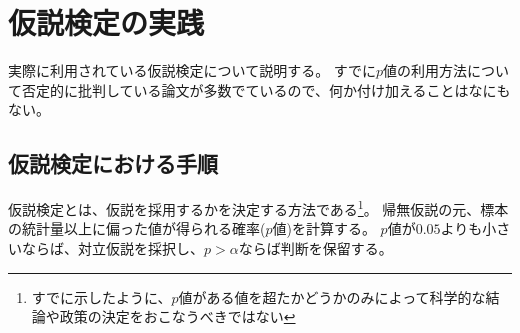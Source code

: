 \chapter{仮説検定の実践}
実際に利用されている仮説検定について説明する。
すでに$p$値の利用方法について否定的に批判している論文が多数でているので、何か付け加えることはなにもない。



\section{仮説検定における手順}
仮説検定とは、仮説を採用するかを決定する方法である\footnote{すでに示したように、$p$値がある値を超たかどうかのみによって科学的な結論や政策の決定をおこなうべきではない}。
帰無仮説の元、標本の統計量以上に偏った値が得られる確率($p$値)を計算する。
$p$値が$0.05$よりも小さいならば、対立仮説を採択し、$p>\alpha$ならば判断を保留する。

